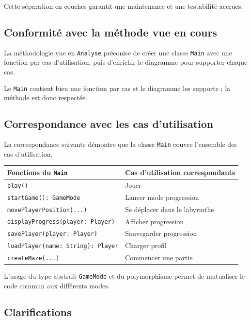 \documentclass{butexFR}
\begin{document}
Cette séparation en couches garantit une maintenance et une testabilité accrues.

\subsection{Conformité avec la méthode vue en cours}

La méthodologie vue en \texttt{Analyse} préconise de créer une classe \texttt{Main} avec une fonction par cas d'utilisation, puis d'enrichir le diagramme pour supporter chaque cas.

Le \texttt{Main} contient bien une fonction par cas et le diagramme les supporte ; la méthode est donc respectée.

\subsection{Correspondance avec les cas d'utilisation}

La correspondance suivante démontre que la classe \texttt{Main} couvre l'ensemble des cas d'utilisation.

\vspace{1em}
\begin{center}
\begin{tabular}{|p{5cm}|p{8cm}|}
\hline
\textbf{Fonctions du \texttt{Main}} & \textbf{Cas d'utilisation correspondants} \\
\hline
\texttt{play()} & Jouer \\
\hline
\texttt{startGame(): GameMode} & Lancer mode progression\\
\hline
\texttt{movePlayerPosition(...)} & Se déplacer dans le labyrinthe \\
\hline
\texttt{displayProgress(player: Player)} & Afficher progression \\
\hline
\texttt{savePlayer(player: Player)} & Sauvegarder progression\\
\hline
\texttt{loadPlayer(name: String): Player} & Charger profil \\
\hline
\texttt{createMaze(...)} & Commencer une partie\\
\hline
\end{tabular}
\end{center}
\vspace{1em}

L'usage du type abstrait \texttt{GameMode} et du polymorphisme permet de mutualiser le code commun aux différents modes.

\subsection{Clarifications}
\end{document}
